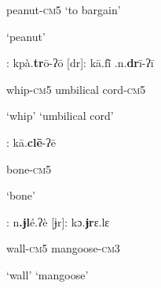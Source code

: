 \begin{styleindexi}
                    peanut-\textsc{cm}5                                           ‘to bargain’   
\end{styleindexi}

\begin{styleindexi}
                    ‘peanut’ 
\end{styleindexi}

\begin{styleindexi}
             [tr]:    kpà.\textbf{tr}ō-ʔō                                   [dr]:    kā.fĩ\={} .n.\textbf{dr}ī-ʔī      
\end{styleindexi}

\begin{styleindexi}
                    whip-\textsc{cm}5                                              umbilical cord-\textsc{cm}5      
\end{styleindexi}

\begin{styleindexi}
                    ‘whip’                                                  ‘umbilical cord’
\end{styleindexi}

\begin{styleindexi}
            [cl]:   kā.\textbf{clē}{}-ʔē                                     
\end{styleindexi}

\begin{styleindexi}
                    bone-\textsc{cm}5                                              
\end{styleindexi}

\begin{styleindexi}
                    ‘bone’                                                  
\end{styleindexi}

\begin{styleindexi}
            [ɉl]:     n\textbf{.ɉl}é.ʔè                                       [ɉr]:      kɔ.\textbf{ɉr}ɛ.lɛ           
\end{styleindexi}

\begin{styleindexi}
                    wall-\textsc{cm}5                                              mangoose-\textsc{cm}3    
\end{styleindexi}

\begin{styleindexi}
                    ‘wall’                                                  ‘mangoose’
\end{styleindexi}

